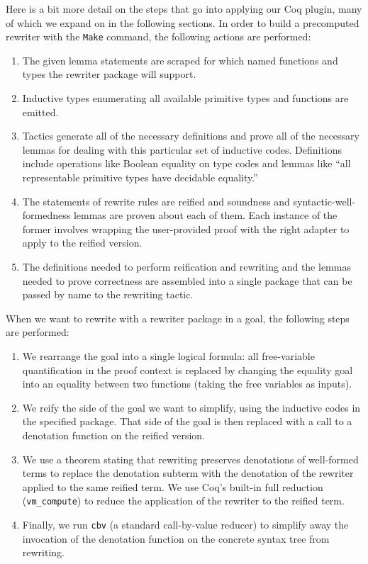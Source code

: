 Here is a bit more detail on the steps that go into applying our Coq plugin, many of which we expand on in the following sections.
In order to build a precomputed rewriter with the \texttt{Make} command, the following actions are performed:
\begin{enumerate}
\item
  The given lemma statements are scraped for which named functions and types the rewriter package will support.
\item
  Inductive types enumerating all available primitive types and functions are emitted.
\item
  Tactics generate all of the necessary definitions and prove all of the necessary lemmas for dealing with this particular set of inductive codes.
  Definitions include operations like Boolean equality on type codes and lemmas like ``all representable primitive types have decidable equality.''
\item
  The statements of rewrite rules are reified and soundness and syntactic-well-formedness lemmas are proven about each of them.
  Each instance of the former involves wrapping the user-provided proof with the right adapter to apply to the reified version.
\item
  The definitions needed to perform reification and rewriting and the lemmas needed to prove correctness are assembled into a single package that can be passed by name to the rewriting tactic.
\end{enumerate}

When we want to rewrite with a rewriter package in a goal, the following steps are performed:
\begin{enumerate}
\item
  We rearrange the goal into a single logical formula: all free-variable quantification in the proof context is replaced by changing the equality goal into an equality between two functions (taking the free variables as inputs).
\item
  We reify the side of the goal we want to simplify, using the inductive codes in the specified package.  That side of the goal is then replaced with a call to a denotation function on the reified version.
\item
  We use a theorem stating that rewriting preserves denotations of well-formed terms to replace the denotation subterm with the denotation of the rewriter applied to the same reified term.
  We use Coq's built-in full reduction (\texttt{vm\_compute}) to reduce the application of the rewriter to the reified term.
\item
  Finally, we run \texttt{cbv} (a standard call-by-value reducer) to simplify away the invocation of the denotation function on the concrete syntax tree from rewriting.
\end{enumerate}


